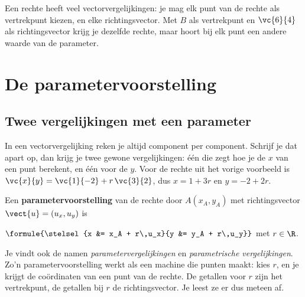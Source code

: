 Een rechte heeft veel vectorvergelijkingen: je mag elk punt van de rechte als vertrekpunt kiezen, en elke richtingsvector. Met $B$ als vertrekpunt en $\vc{6}{4}$ als richtingsvector krijg je dezelfde rechte, maar hoort bij elk punt een andere waarde van de parameter.

\begin{oefeningen}
\end{oefeningen}

\section{De parametervoorstelling}

\subsection{Twee vergelijkingen met een parameter}

In een vectorvergelijking reken je altijd component per component. Schrijf je dat apart op, dan krijg je twee gewone vergelijkingen: één die zegt hoe je de $x$ van een punt berekent, en één voor de $y$. Voor de rechte uit het vorige voorbeeld is $\vc{x}{y} = \vc{1}{-2} + r\,\vc{3}{2}$, dus $x = 1 + 3r$ en $y = -2 + 2r$.

\begin{theorie}
Een \textbf{\textcolor{accent}{parametervoorstelling}} van de rechte door $A(x_A, y_A)$ met richtingsvector $\vect{u} = (u_x, u_y)$ is

\vspace{1mm}
\qquad $\formule{\stelsel{x &= x_A + r\,u_x}{y &= y_A + r\,u_y}}$ \qquad met $r \in \R$.
\end{theorie}

Je vindt ook de namen \textit{parametervergelijkingen} en \textit{parametrische vergelijkingen}. Zo'n parametervoorstelling werkt als een machine die punten maakt: kies $r$, en je krijgt de coördinaten van een punt van de rechte. De getallen voor $r$ zijn het vertrekpunt, de getallen bij $r$ de richtingsvector. Je leest ze er dus meteen af.

